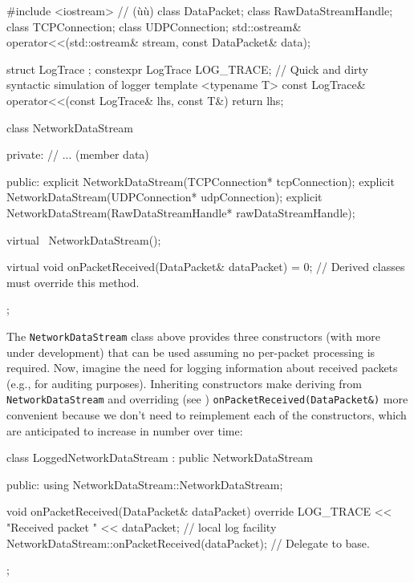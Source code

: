 \begin{emcppshiddenlisting}[emcppsbatch=e4]
#include <iostream>   // (ù{}ù)
class DataPacket;                                                               
class RawDataStreamHandle;                                                      
class TCPConnection;                                                            
class UDPConnection;
std::ostream& operator<<(std::ostream& stream, const DataPacket& data);

struct LogTrace {};
constexpr LogTrace LOG_TRACE; // Quick and dirty syntactic simulation of logger
template <typename T>
const LogTrace& operator<<(const LogTrace& lhs, const T&) { return lhs; }
\end{emcppshiddenlisting}
\begin{emcppslisting}[emcppsbatch=e4]
class NetworkDataStream
{
private:
    // ...                   (member data)

public:
    explicit NetworkDataStream(TCPConnection* tcpConnection);
    explicit NetworkDataStream(UDPConnection* udpConnection);
    explicit NetworkDataStream(RawDataStreamHandle* rawDataStreamHandle);

    virtual ~NetworkDataStream();

    virtual void onPacketReceived(DataPacket& dataPacket) = 0;
        // Derived classes must override this method.
};        
\end{emcppslisting}
    
\noindent The \lstinline!NetworkDataStream! class above provides three constructors (with more
under development) that can be used assuming no per-packet processing is
required. Now, imagine the need for logging information about received
packets (e.g., for auditing purposes). Inheriting constructors make
deriving from \lstinline!NetworkDataStream! and overriding (see ) 
\lstinline!onPacketReceived(DataPacket&)! more convenient because we don't need to reimplement each of the constructors, which are
anticipated to increase in number over time:

\begin{emcppslisting}[emcppsbatch=e4]
class LoggedNetworkDataStream : public NetworkDataStream
{
public:
    using NetworkDataStream::NetworkDataStream;

    void onPacketReceived(DataPacket& dataPacket) override
    {
        LOG_TRACE << "Received packet " << dataPacket;    // local log facility
        NetworkDataStream::onPacketReceived(dataPacket);  // Delegate to base.
    }
};
\end{emcppslisting}
    

